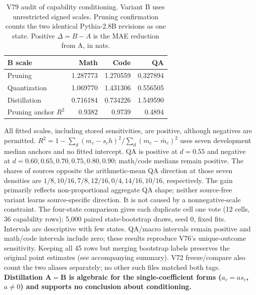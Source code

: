 \begin{table}[H]
\centering\small
\setlength{\tabcolsep}{4pt}
\caption{V79 audit of capability conditioning. Variant B uses unrestricted signed scales. Pruning confirmation counts the two identical Pythia-2.8B revisions as one state. Positive $\Delta=B-A$ is the MAE reduction from A, in nats.}
\label{tab:cond_audit}
\begin{tabular}{lrrr}
\toprule
B scale & Math & Code & QA \\
\midrule
Pruning & 1.287773 & 1.270559 & 0.327894 \\
Quantization & 1.069770 & 1.431306 & 0.556505 \\
Distillation & 0.716184 & 0.734226 & 1.549590 \\
\midrule
Pruning anchor $R^2$ & 0.9382 & 0.9739 & 0.4894 \\
\bottomrule
\end{tabular}
\par\medskip
{}
\par\smallskip
\begin{minipage}{0.99\linewidth}\footnotesize All fitted scales, including stored sensitivities, are positive, although negatives are permitted. $R^2=1-\sum_d(m_c-s_ch)^2/\sum_d(m_c-\bar m_c)^2$ uses seven development median anchors and no fitted intercept. QA is positive at $d=0.55$ and negative at $d=0.60,0.65,0.70,0.75,0.80,0.90$; math/code medians remain positive. The shares of sources opposite the arithmetic-mean QA direction at those seven densities are $1/8,10/16,7/8,12/16,0/4,14/16,10/16$, respectively. The gain primarily reflects non-proportional aggregate QA shape; neither source-free variant learns source-specific direction. It is not caused by a nonnegative-scale constraint. The four-state comparison gives each duplicate cell one vote (12 cells, 36 capability rows); 5,000 paired state-bootstrap draws, seed 0, fixed fits. Intervals are descriptive with few states. QA/macro intervals remain positive and math/code intervals include zero; these results reproduce V76's unique-outcome sensitivity. Keeping all 45 rows but merging bootstrap labels preserves the original point estimates (see accompanying summary). V72 freeze/compare also count the two aliases separately; no other such files matched both tags. \textbf{Distillation A$=$B is algebraic for the single-coefficient forms ($a_c=a s_c$, $a\ne0$) and supports no conclusion about conditioning.} \end{minipage}
\end{table}
